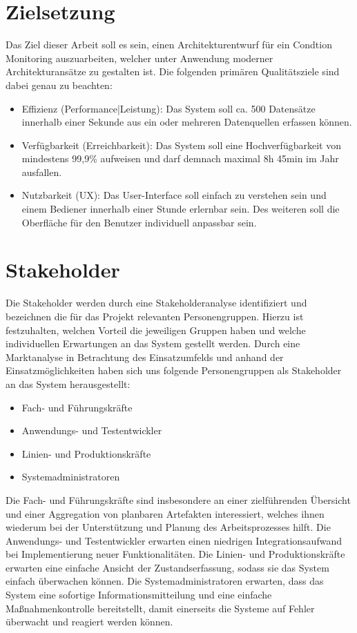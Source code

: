 \section{Zielsetzung}
Das Ziel dieser Arbeit soll es sein, einen Architekturentwurf für ein Condtion Monitoring auszuarbeiten, welcher unter Anwendung moderner Architekturansätze zu gestalten ist. Die folgenden primären Qualitätsziele sind dabei genau zu beachten:
\begin{itemize}
	\item Effizienz (Performance|Leistung): Das System soll ca. 500 Datensätze innerhalb einer Sekunde aus ein oder mehreren Datenquellen erfassen können.
 	\item Verfügbarkeit (Erreichbarkeit): Das System soll eine Hochverfügbarkeit von mindestens 99,9\% aufweisen und darf demnach maximal 8h 45min im Jahr ausfallen.
 	\item Nutzbarkeit (UX): Das User-Interface soll einfach zu verstehen sein und einem Bediener innerhalb einer Stunde erlernbar sein. Des weiteren soll die Oberfläche für den Benutzer individuell anpassbar sein.
\end{itemize}

\section{Stakeholder}
Die Stakeholder werden durch eine Stakeholderanalyse identifiziert und bezeichnen die für das Projekt relevanten Personengruppen. 
Hierzu ist festzuhalten, welchen Vorteil die jeweiligen Gruppen haben und welche individuellen Erwartungen an das System gestellt werden. Durch eine Marktanalyse in Betrachtung des Einsatzumfelds und anhand der Einsatzmöglichkeiten haben sich uns folgende Personengruppen als Stakeholder an das System herausgestellt:
\begin{itemize}
	\item Fach- und Führungskräfte
	\item Anwendungs- und Testentwickler
	\item Linien- und Produktionskräfte
	\item Systemadministratoren
\end{itemize}
Die Fach- und Führungskräfte sind insbesondere an einer zielführenden Übersicht und einer Aggregation von planbaren Artefakten interessiert, welches ihnen wiederum bei der Unterstützung und Planung des Arbeitsprozesses hilft.   
Die Anwendungs- und Testentwickler erwarten einen niedrigen Integrationsaufwand bei Implementierung neuer Funktionalitäten. 
Die Linien- und Produktionskräfte erwarten eine einfache Ansicht der Zustandserfassung, sodass sie das System einfach überwachen können.
Die Systemadministratoren erwarten, dass das System eine sofortige Informationsmitteilung und eine einfache Maßnahmenkontrolle bereitstellt, damit einerseits die Systeme auf Fehler überwacht und reagiert werden können.
